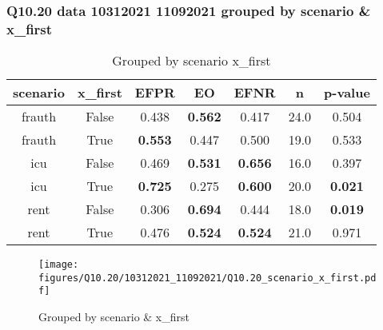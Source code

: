 \subsubsection{Q10.20 data 10312021 11092021 grouped by scenario \& x_first}

\begin{comment}
                     EFPR        EO      EFNR     n    pvalue
(frauth, False)  0.437500  0.562500  0.416667  24.0  0.504036
(frauth, True)   0.552632  0.447368  0.500000  19.0  0.533114
(icu, False)     0.468750  0.531250  0.656250  16.0  0.396605
(icu, True)      0.725000  0.275000  0.600000  20.0  0.020688
(rent, False)    0.305556  0.694444  0.444444  18.0  0.019016
(rent, True)     0.476190  0.523810  0.523810  21.0  0.971474
\end{comment}

\begin{table}[h]
    \centering
    \begin{tabular}{|c|c|c|c|c|c|c|}
        \hline
        scenario & x_first & EFPR & EO & EFNR & n & p-value\\
        \hline
        frauth & False & 0.438 & \textbf{0.562} & 0.417 & 24.0 & 0.504\\
		frauth & True & \textbf{0.553} & 0.447 & 0.500 & 19.0 & 0.533\\
		icu & False & 0.469 & \textbf{0.531} & \textbf{0.656} & 16.0 & 0.397\\
		icu & True & \textbf{0.725} & 0.275 & \textbf{0.600} & 20.0 & \textbf{0.021}\\
		rent & False & 0.306 & \textbf{0.694} & 0.444 & 18.0 & \textbf{0.019}\\
		rent & True & 0.476 & \textbf{0.524} & \textbf{0.524} & 21.0 & 0.971\\
		
        \hline
    \end{tabular}
    \caption{Grouped by scenario x_first}
    \label{tab:my_label}
\end{table}
\begin{figure}[h]
    \centering
    \texttt{[image: figures/Q10.20/10312021\_11092021/Q10.20\_scenario\_x\_first.pdf]}
    \caption{Grouped by scenario \& x_first}
    \label{fig:my_label}
\end{figure}

